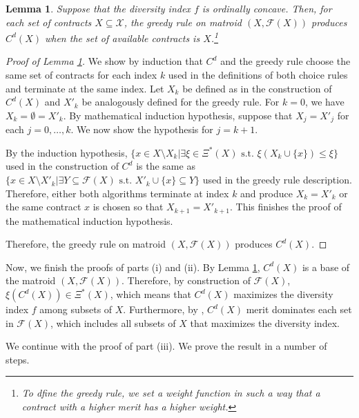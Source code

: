 \documentclass[12pt]{amsart}
\newtheorem{lemma}{Lemma}
\theoremstyle{remark}
\def\oconcave{ordinally concave} %
\begin{document}
\begin{lemma}\label{lem:equal}
Suppose that the diversity index $f$ is \oconcave. Then, for each set of contracts
$X\subseteq \mathcal{X}$, the greedy rule on matroid $(X,\mathcal{F}(X))$ produces
$C^d(X)$ when the set of available contracts is $X$.\footnote{To dfine the greedy rule, we set a weight function in such a way that a contract with a higher merit has a higher weight.}
\end{lemma}

\begin{proof}[Proof of Lemma \ref{lem:equal}]\renewcommand{\qedsymbol}{$\blacksquare$}
We show by induction
that $C^d$ and the greedy rule choose the same set of contracts for each index $k$
used in the definitions of both choice rules and terminate at the same index. Let $X_k$ be defined as in the construction of $C^d(X)$ and $X'_k$ be analogously
defined for the greedy rule. For $k=0$, we have $X_k=\emptyset=X'_k$.
By mathematical induction hypothesis, suppose that $X_j=X'_j$ for
each $j=0,\ldots,k$. We now show the hypothesis for $j=k+1$.

By the induction hypothesis, $\{x\in X\setminus X_k| \exists \xi\in \Xi^*(X) \mbox{ s.t. } \xi(X_k \cup \{x\}) \leq \xi\}$ used in the construction of $C^d$ is the same as
$\{x \in X\setminus X'_k|\exists Y \subseteq \mathcal{F}(X)
\mbox{ s.t. } X'_k \cup \{x\} \subseteq Y\}$ used in the greedy rule description.  Therefore, either both algorithms terminate at index $k$ and produce $X_k=X'_k$
or the same contract $x$ is chosen so that $X_{k+1}=X'_{k+1}$. This
finishes the proof of the mathematical induction hypothesis.

Therefore, the greedy rule on matroid $(X,\mathcal{F}(X))$ produces $C^d(X)$.
\end{proof}

Now, we finish the proofs of parts (i) and (ii).
By Lemma \ref{lem:equal}, $C^d(X)$ is a base of the matroid $(X,\mathcal{F}(X))$.
Therefore, by construction of $\mathcal{F}(X)$, $\xi(C^d(X))\in \Xi^*(X)$,
which means that $C^d(X)$ maximizes the diversity index $f$ among subsets of $X$.
Furthermore, by \citep{gale1968}, $C^d(X)$ merit dominates each set in $\mathcal{F}(X)$, which includes all subsets of $X$ that maximizes the diversity index.

We continue with the proof of part (iii). We prove the result in a number of steps.
\end{document}
